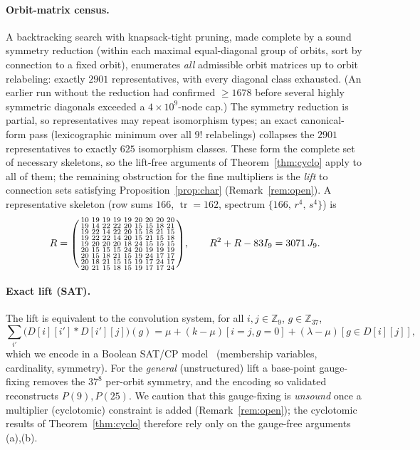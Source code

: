 \documentclass[11pt]{article}
\theoremstyle{definition}
\newcommand{\Z}{\mathbb{Z}}
\begin{document}
\paragraph{Orbit-matrix census.} A backtracking search with knapsack-tight pruning, made complete by a
sound symmetry reduction (within each maximal equal-diagonal group of orbits, sort by connection to a fixed
orbit), enumerates \emph{all} admissible orbit matrices up to orbit relabeling: exactly $2901$
representatives, with every diagonal class exhausted. (An earlier run without the reduction had confirmed
$\ge1678$ before several highly symmetric diagonals exceeded a $4\times10^{9}$-node cap.) The symmetry
reduction is partial, so representatives may repeat isomorphism types; an exact canonical-form pass
(lexicographic minimum over all $9!$ relabelings) collapses the $2901$ representatives to exactly $625$
isomorphism classes. These form the complete set of necessary skeletons, so the lift-free arguments of
Theorem~\ref{thm:cyclo} apply to all of them; the remaining obstruction for the fine multipliers is the
\emph{lift} to connection sets satisfying Proposition~\ref{prop:char} (Remark~\ref{rem:open}). A representative skeleton
(row sums $166$, $\operatorname{tr}=162$, spectrum $\{166,\,r^{4},\,s^{4}\}$) is
\[
R=\begin{psmallmatrix}
10&19&19&19&19&20&20&20&20\\
19&14&22&22&20&15&15&18&21\\
19&22&14&22&20&15&18&21&15\\
19&22&22&14&20&15&21&15&18\\
19&20&20&20&18&24&15&15&15\\
20&15&15&15&24&20&19&19&19\\
20&15&18&21&15&19&24&17&17\\
20&18&21&15&15&19&17&24&17\\
20&21&15&18&15&19&17&17&24
\end{psmallmatrix},\qquad R^2+R-83I_9=3071\,J_9 .
\]

\paragraph{Exact lift (SAT).} The lift is equivalent to the convolution system, for all $i,j\in\Z_9$,
$g\in\Z_{37}$,
\[
\sum_{i'}\bigl(D[i][i']\ast D[i'][j]\bigr)(g)=\mu+(k-\mu)[i{=}j,g{=}0]+(\lambda-\mu)[g\in D[i][j]],
\]
which we encode in a Boolean SAT/CP model~\cite{satcas} (membership variables, cardinality, symmetry). For
the \emph{general} (unstructured) lift a base-point gauge-fixing removes the $37^{8}$ per-orbit symmetry,
and the encoding so validated reconstructs $P(9),P(25)$. We caution that this gauge-fixing is
\emph{unsound} once a multiplier (cyclotomic) constraint is added (Remark~\ref{rem:open}); the cyclotomic
results of Theorem~\ref{thm:cyclo} therefore rely only on the gauge-free arguments (a),(b).
\end{document}
